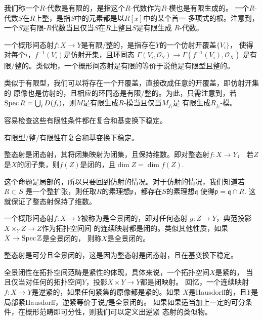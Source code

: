 \begin{para}[有限（整）态射]
	我们称一个$R$-代数是有限的，是指这个$R$-代数作为$R$-模也是有限生成的。
	一个$R$-代数$S$在$R$上整，是指$S$中的元素都是以$R[x]$中的某个首一
	多项式的根。注意到，一个$S$是有限-$R$代数当且仅当$S$在$R$上整且$S$是有限生成
	$R$-代数。

	一个概形间态射$f:X\to Y$是有限/整的，是指存在$Y$的一个仿射开覆盖$\{V_i\}$，
	使得对每个$i$，$f^{-1}(V_i)$是仿射开集，且环同态
	$\Gamma(V_i,\mathcal O_Y)\to\Gamma(f^{-1}(V_i),\mathcal O_X)$
	是有限/整的。类似地，一个概形间态射是有限的等价于说他是有限型且整的。
\end{para}

类似于有限型，我们可以将存在一个开覆盖，直接改成任意的开覆盖，即仿射开集的
原像也是仿射的，且相应的环同态是有限/整的。为此，只需注意到，若
$\operatorname{Spec} R=\bigcup_i D(f_i)$，则$M$是有限生成$R$-模当且仅当$M_{f_i}$是
有限生成$R_{f_i}$-模。

容易检查这些有限性条件都在复合和基变换下稳定。

\begin{pro}
	有限型/整/有限性在复合和基变换下稳定。
\end{pro}

\begin{pro}
	整态射是闭态射，其将闭集映射为闭集，且保持维数。即对整态射$f:X\to Y$，
	若$Z$是$X$的闭子集，则$f(Z)$是闭的，且$\dim Z=\dim f(Z)$.
\end{pro}

这个命题是局部的，所以只要回到仿射的情况。对于仿射的情况，我们知道若$R\subset S$
是一个整扩张，则任取$R$的素理想$\mathfrak p$，都存在$S$的素理想$\mathfrak q$
使得$\mathfrak p=\mathfrak q\cap R$. 这就保证了整态射保持了维数。

\begin{para}[全景闭性]
	一个概形间态射$f:X\to Y$被称为是全景闭的，即对任何态射
	$g:Z\to Y$，典范投影$X\times_Y Z\to Z$作为拓扑空间间
	的连续映射都是闭的。类似其他性质，如果$X\to \operatorname{Spec} \mathbb{Z}$是全景闭的，
	则称$X$是全景闭的。
\end{para}

整态射是可分且全景闭的，这是因为整态射是闭态射，且在基变换下稳定。

全景闭性在拓扑空间范畴是紧性的体现，具体来说，一个拓扑空间$X$是紧的，
当且仅当对任何的拓扑空间$Y$，投影$X\times Y\to Y$都是闭映射。
回忆，一个连续映射$f:X\to Y$是逆紧的，如果任何紧集的原像都是紧的。如果
$X$是Hausdorff的，且$Y$是局部紧Hausdorff，逆紧等价于说$f$是全景闭的。
如果如果适当加上一定的可分条件，在概形范畴即可分性，则我们可以定义出逆紧
态射的类似物。

